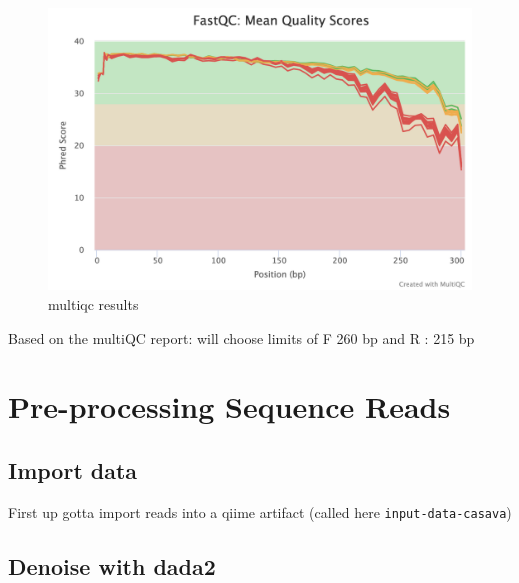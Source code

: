 \documentclass[
]{book}
\newenvironment{Shaded}{\begin{snugshade}}{\end{snugshade}}
\newcommand{\ExtensionTok}[1]{#1}
\newcommand{\NormalTok}[1]{#1}
\newcommand{\StringTok}[1]{\textcolor[rgb]{0.31,0.60,0.02}{#1}}
\begin{document}
\begin{figure}
\centering
\includegraphics{figs/fastqc_per_base_sequence_quality_plot.png}
\caption{multiqc results}
\end{figure}

Based on the multiQC report: will choose limits of F 260 bp and R : 215 bp

\hypertarget{pre-processing-sequence-reads}{%
\chapter{Pre-processing Sequence Reads}\label{pre-processing-sequence-reads}}

\hypertarget{import-data}{%
\section{Import data}\label{import-data}}

First up gotta import reads into a qiime artifact (called here \texttt{input-data-casava})

\begin{Shaded}
\end{Shaded}

\hypertarget{denoise-with-dada2}{%
\section{Denoise with dada2}\label{denoise-with-dada2}}
\end{document}
